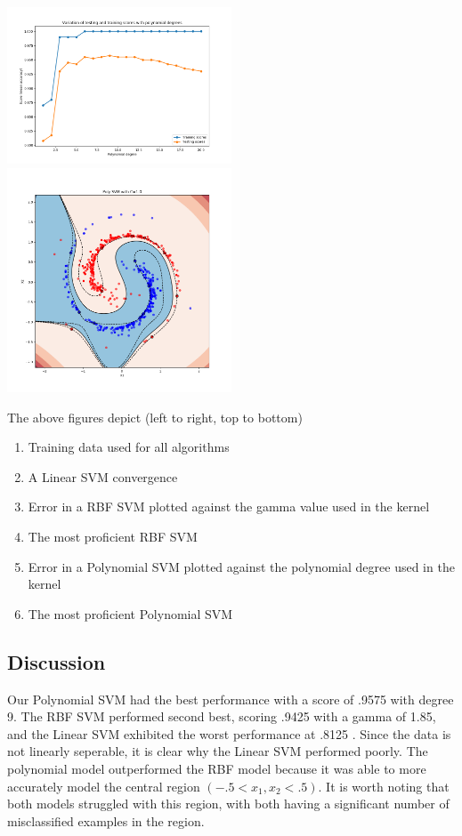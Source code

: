 \documentclass[a4paper]{article}
\begin{document}
\includegraphics[width=0.5\textwidth]{poly_error.png}%
\includegraphics[width=0.5\textwidth]{poly_fit.png}\par

The above figures depict (left to right, top to bottom)

\begin{enumerate}
	\item Training data used for all algorithms
	\item A Linear SVM convergence
	\item Error in a RBF SVM plotted against the gamma value used in the kernel
	\item The most proficient RBF SVM
	\item Error in a Polynomial SVM plotted against the polynomial degree used in the kernel
	\item The most proficient Polynomial SVM
\end{enumerate}


\subsection*{Discussion}

Our Polynomial SVM had the best performance with a score of .9575 with degree 9.  The RBF SVM performed second best, scoring .9425 with a gamma of 1.85, and the Linear SVM exhibited the worst performance at .8125 .  Since the data is not linearly seperable, it is clear why the Linear SVM performed poorly.  The polynomial model outperformed the RBF model because it was able to more accurately model the central region $(-.5 < x_1, x_2 < .5)$.  It is worth noting that both models struggled with this region, with both having a significant number of misclassified examples in the region.
\end{document}
